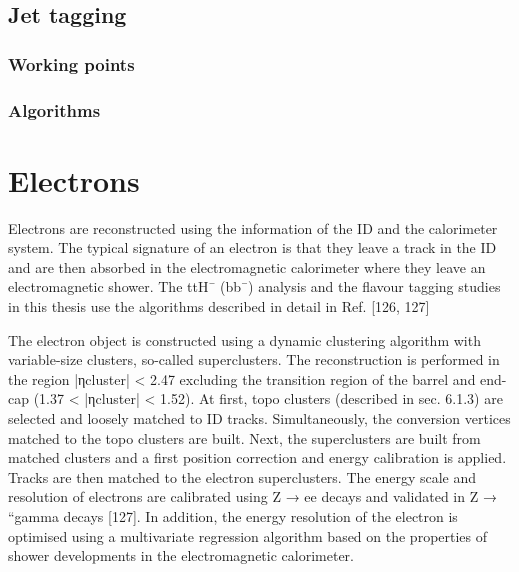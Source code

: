 \subsection{Jet tagging}



\subsubsection{Working points}

\subsubsection{Algorithms}




\section{Electrons}

Electrons are reconstructed using the information of the ID and the calorimeter system. The typical
signature of an electron is that they leave a track in the ID and are then absorbed in the electromagnetic calorimeter where they leave an electromagnetic shower. The ttH¯ (bb¯) analysis and the flavour
tagging studies in this thesis use the algorithms described in detail in Ref. [126, 127]

The electron object is constructed using a dynamic clustering algorithm with variable-size clusters,
so-called superclusters. The reconstruction is performed in the region |ηcluster| < 2.47 excluding the
transition region of the barrel and end-cap (1.37 < |ηcluster| < 1.52).
At first, topo clusters (described in sec. 6.1.3) are selected and loosely matched to ID tracks. Simultaneously, the conversion vertices matched to the topo clusters are built. Next, the superclusters are
built from matched clusters and a first position correction and energy calibration is applied. Tracks
are then matched to the electron superclusters. The energy scale and resolution of electrons are
calibrated using Z → ee decays and validated in Z → ``gamma decays [127]. In addition, the energy resolution of the electron is optimised using a multivariate regression algorithm based on the properties
of shower developments in the electromagnetic calorimeter.

